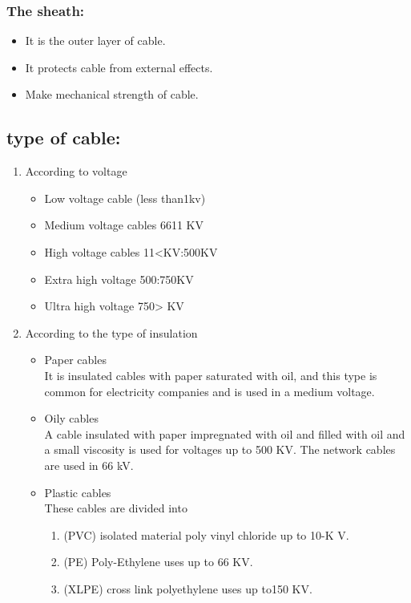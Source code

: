 \documentclass[12pt,fleqn]{book} %
\begin{document}
\subsubsection{The sheath: }
\begin{itemize}
    \item 		It is the outer layer of cable.
    \item It protects cable from external effects.
    \item	Make mechanical strength of cable.
\end{itemize}
 \subsection{ type of cable:}
 \begin{enumerate}
   \item  According to voltage
   \begin{itemize}
    \item 	Low voltage cable (less than1kv)
    \item Medium voltage cables 6611 KV
    \item	High voltage cables 11<KV:500KV
    \item Extra high voltage 500:750KV
    \item Ultra high voltage 750> KV
\end{itemize}
    \item  According to the type of insulation
    \begin{itemize}
    \item 	Paper cables
     \\It is insulated cables with paper saturated with oil, and this type is common for electricity companies and is used in a medium voltage.
    \item Oily cables
    \\A cable insulated with paper impregnated with oil and filled with oil and a small viscosity is used for voltages up to 500 KV.   The network cables are used in 66 kV.
    \item	Plastic cables
    \\These cables are divided into
    \begin{enumerate}
   \item (PVC) isolated material poly vinyl chloride up to 10-K V.
    \item (PE) Poly-Ethylene uses up to 66 KV.
   \item (XLPE) cross link polyethylene uses up to150 KV.
   

\end{enumerate}
\end{itemize}
\end{enumerate}
\end{document}
